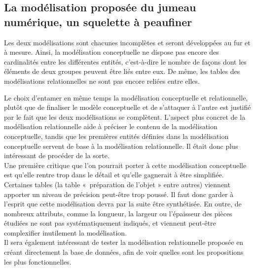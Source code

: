        \subsection{La modélisation proposée du jumeau numérique, un squelette à peaufiner}

Les deux modélisations sont chacunes incomplètes et seront développées au fur et à mesure. Ainsi, la modélisation conceptuelle ne dispose pas encore des cardinalités entre les différentes entités, c'est-à-dire le nombre de façons dont les éléments de deux groupes peuvent être liés entre eux. De même, les tables des modélisations relationnelles ne sont pas encore reliées entre elles.

Le choix d’entamer en même temps la modélisation conceptuelle et relationnelle, plutôt que de finaliser le modèle conceptuelle et de s’attaquer à l’autre est justifié par le fait que les deux modélisations se complètent. L’aspect plus concret de la modélisation relationnelle aide à préciser le contenu de la modélisation conceptuelle, tandis que les premières entités définies dans la modélisation conceptuelle servent de base à la modélisation relationnelle. Il était donc plus intéressant de procéder de la sorte.\\

Une première critique que l’on pourrait porter à cette modélisation conceptuelle est qu’elle rentre trop dans le détail et qu’elle gagnerait à être simplifiée. Certaines tables (la table « préparation de l’objet » entre autres) viennent apporter un niveau de précision peut-être trop poussé. Il faut donc garder à l’esprit que cette modélisation devra par la suite être synthétisée. En outre, de nombreux attributs, comme la longueur, la largeur ou l’épaisseur des pièces étudiées ne sont pas systématiquement indiqués, et viennent peut-être complexifier inutilement la modélisation.\\

Il sera également intéressant de tester la modélisation relationnelle proposée en créant directement la base de données, afin de voir quelles sont les propositions les plus fonctionnelles.
        
        
   
